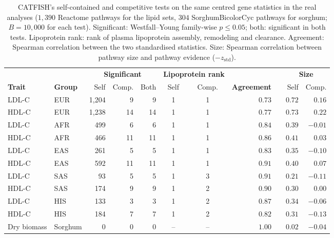 \begin{table}[!htbp]
\centering
\caption{CATFISH's self-contained and competitive tests on the same centred gene statistics in the real analyses ($1{,}390$ Reactome pathways for the lipid sets, $304$ SorghumBicolorCyc pathways for sorghum; $B=10{,}000$ for each test). Significant: Westfall--Young family-wise $p\le0.05$; both: significant in both tests. Lipoprotein rank: rank of plasma lipoprotein assembly, remodeling and clearance. Agreement: Spearman correlation between the two standardised statistics. Size: Spearman correlation between pathway size and pathway evidence ($-z_{\mathrm{std}}$).}
\label{tab:competitive_real}
\small
\begin{tabular*}{\linewidth}{@{\extracolsep{\fill}}llrrrccrcrr}
\hline
 & & \multicolumn{3}{c}{\textbf{Significant}} & \multicolumn{2}{c}{\textbf{Lipoprotein rank}} & & & \multicolumn{2}{c}{\textbf{Size}} \\
\textbf{Trait} & \textbf{Group} & Self & Comp. & Both & Self & Comp. & \textbf{Agreement} & & Self & Comp. \\
\hline
LDL-C & EUR & 1{,}204 & 9 & 9 & 1 & 1 & $0.73$ & & $0.72$ & $0.16$ \\
HDL-C & EUR & 1{,}238 & 14 & 14 & 1 & 1 & $0.77$ & & $0.73$ & $0.22$ \\
LDL-C & AFR & 499 & 6 & 6 & 1 & 1 & $0.84$ & & $0.39$ & $-0.01$ \\
HDL-C & AFR & 466 & 11 & 11 & 1 & 1 & $0.86$ & & $0.41$ & $0.03$ \\
LDL-C & EAS & 261 & 5 & 5 & 1 & 1 & $0.83$ & & $0.35$ & $-0.10$ \\
HDL-C & EAS & 592 & 11 & 11 & 1 & 1 & $0.91$ & & $0.40$ & $0.07$ \\
LDL-C & SAS & 93 & 5 & 5 & 1 & 3 & $0.91$ & & $0.21$ & $-0.11$ \\
HDL-C & SAS & 174 & 9 & 9 & 1 & 2 & $0.90$ & & $0.30$ & $0.00$ \\
LDL-C & HIS & 133 & 3 & 3 & 1 & 2 & $0.87$ & & $0.34$ & $-0.06$ \\
HDL-C & HIS & 184 & 7 & 7 & 1 & 2 & $0.82$ & & $0.31$ & $-0.13$ \\
\hline
Dry biomass & Sorghum & 0 & 0 & 0 & -- & -- & $1.00$ & & $0.02$ & $-0.04$ \\
\hline
\end{tabular*}
\end{table}
